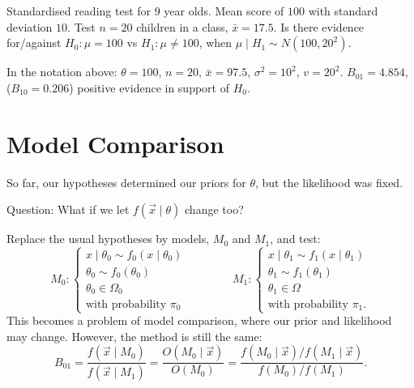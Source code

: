 \documentclass[10pt, a4paper]{article}
\begin{document}
\begin{example}
    Standardised reading test for $9$ year olds.
    Mean score of $100$ with standard deviation $10$.
    Test $n = 20$ children in a class,
    $\bar{x} = 17.5$.
    Is there evidence for/against $H_0 : \mu = 100$ vs $H_1 : \mu \neq 100$,
    when $\mu \mid H_1 \sim N(100, 20 ^ 2)$.

    In the notation above:
    $\theta = 100$,
    $n = 20$,
    $\bar{x} = 97.5$,
    $\sigma ^ 2 = 10 ^ 2$,
    $v = 20 ^ 2$.
    $B_{01} = 4.854$,
    ($B_{10} = 0.206$)
    positive evidence in support of $H_0$.
\end{example}

\newpage

\section{Model Comparison}
So far,
our hypotheses determined our priors for $\theta$,
but the likelihood was fixed.

Question:
What if we let $f(\vec{x} \mid \theta)$ change too?

Replace the usual hypotheses by models,
$M_0$ and $M_1$,
and test:
\[
M_0 : \begin{cases}
    x \mid \theta_0 \sim f_0(x \mid \theta_0) \\
    \theta_0 \sim f_0(\theta_0) \\
    \theta_0 \in \Omega_0 \\
    \text{with probability $\pi_0$}
\end{cases}\qquad\qquad
M_1 : \begin{cases}
    x \mid \theta_1 \sim f_1(x \mid \theta_1) \\
    \theta_1 \sim f_1(\theta_1) \\
    \theta_1 \in \Omega \\
    \text{with probability $\pi_1$}.
\end{cases}
\]
This becomes a problem of model comparison,
where our prior and likelihood may change.
However,
the method is still the same:
\[
B_{01} = \frac{f(\vec{x} \mid M_0)}{f(\vec{x} \mid M_1)} = \frac{O(M_0 \mid \vec{x})}{O(M_0)} = \frac{f(M_0 \mid \vec{x}) / f(M_1 \mid \vec{x})}{f(M_0) / f(M_1)}.
\]
\end{document}
